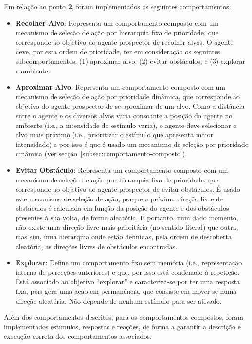 Em relação ao ponto \textbf{2}, foram implementados os seguintes comportamentos:

\begin{itemize}
    \item \textbf{Recolher Alvo}: Representa um comportamento composto com um mecanismo de seleção de ação por hierarquia fixa de prioridade, que corresponde ao objetivo do agente prospector de recolher alvos.
    O agente deve, por esta ordem de prioridade, ter em consideração os seguintes subcomportamentos: (1) aproximar alvo; (2) evitar obstáculos; e (3) explorar o ambiente.
    \item \textbf{Aproximar Alvo}: Representa um comportamento composto com um mecanismo de seleção de ação por prioridade dinâmica, que corresponde ao objetivo do agente prospector de se aproximar de um alvo.
    Como a distância entre o agente e os diversos alvos varia consoante a posição do agente no ambiente (i.e., a intensidade do estímulo varia), o agente deve selecionar o alvo mais próximo (i.e., prioritizar o estímulo que apresenta maior intensidade) e por isso é que é usado um mecanismo de seleção por prioridade dinâmica (ver secção~\ref{subsec:comportamento-composto}).
    \item \textbf{Evitar Obstáculo}: Representa um comportamento composto com um mecanismo de seleção de ação por hierarquia fixa de prioridade, que corresponde ao objetivo do agente prospector de evitar obstáculos.
    É usado este mecanismo de seleção de ação, porque a próxima direção livre de obstáculos é calculada em função da posição do agente e dos obstáculos presentes à sua volta, de forma aleatória.
    E portanto, num dado momento, não existe uma direção livre mais prioritária (no sentido literal) que outra, mas sim, uma hierarquia onde estão definidas, pela ordem de descoberta aleatória, as direções livres de obstáculos encontradas.
    \item \textbf{Explorar}: Define um comportamento fixo sem memória (i.e., representação interna de perceções anteriores) e que, por isso está condenado à repetição. Está associado ao objetivo ``explorar'' e caracteriza-se por ter uma resposta fixa, pois gera uma ação em permanência, que consiste em mover-se numa direção aleatória. Não depende de nenhum estímulo para ser ativado.
\end{itemize}

Além dos comportamentos descritos, para os comportamentos compostos, foram implementados estímulos, respostas e reações, de forma a garantir a descrição e execução correta dos comportamentos associados.

